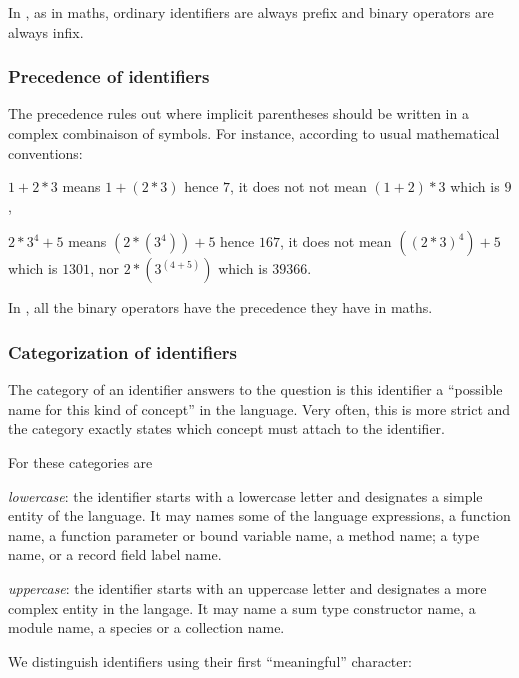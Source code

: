In {\focal}, as in maths, ordinary identifiers are always prefix and binary operators are
always infix.

\subsubsection{Precedence of identifiers}

The precedence rules out where implicit parentheses should be written in a
complex combinaison of symbols. For instance, according to usual mathematical
conventions:
\begin{citemize}
\item $1 + 2 * 3$  means $1 + (2 * 3)$ hence $7$, it does not not mean $(1 +
  2) * 3$ which is $9$,
\item $2 * 3 ^ 4 + 5$ means $(2 * (3 ^ 4)) + 5$ hence $167$, it does not mean
  $((2 * 3) ^ 4) + 5$ which is $1301$, nor $2 * (3 ^ (4 + 5))$ which is $39366$.
\end{citemize}

In {\focal}, all the binary operators have the precedence they have in maths.

\subsubsection{Categorization of identifiers}

The category of an identifier answers to the question is this identifier a
``possible name for this kind of concept'' in the language.
Very often, this is more strict and the category exactly states which concept
must attach to the identifier.

For {\focal} these categories are
\begin{citemize}
\item {\em lowercase}: the identifier starts with a lowercase letter and
  designates a simple entity of the language. It may names some of
  the language expressions, a function name, a function parameter or bound
  variable name, a method name; a type name, or a record field label name.

\item {\em uppercase}: the identifier starts with an uppercase letter and
  designates a more complex entity in the langage. It may name a sum type
  constructor name, a module name, a species or a collection name.
\end{citemize}

We distinguish identifiers using their first ``meaningful'' character:

